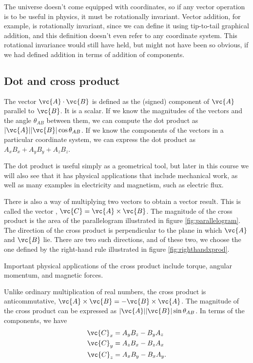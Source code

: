 The universe doesn't come equipped with coordinates, so if any vector operation is to be useful in
physics, it must be rotationally invariant. Vector addition, for example, is rotationally invariant, since we
can define it using tip-to-tail graphical addition, and this definition doesn't even refer to any coordinate
system. This rotational invariance would still have held, but might not have been so obvious,
if we had defined addition in terms of addition of components.

\subsection{Dot and cross product}

The vector  $\vc{A}\cdot\vc{B}$ is defined as the (signed) component of $\vc{A}$
parallel to $\vc{B}$. It is a scalar. If we know the magnitudes of the vectors and the angle $\theta_{AB}$ between them,
we can compute the dot product as $|\vc{A}||\vc{B}|\cos\theta_{AB}$. If we know the components of
the vectors in a particular coordinate system, we can express the dot product as
$A_xB_x+A_yB_y+A_zB_z$.

The dot product is useful simply as a geometrical tool, but later in this course we will also see that it
has physical applications that include mechanical work, as well as many examples in electricity and magnetism,
such as electric flux.

There is also a way of multiplying two vectors to obtain a vector result. This is called the
vector , $\vc{C}=\vc{A}\times\vc{B}$.
The magnitude of the cross product is the area of the parallelogram
illustrated in figure \ref{fig:parallelogram}.
The direction of the cross product is perpendicular to the plane in which $\vc{A}$ and $\vc{B}$ lie.
There are two such directions, and of these two, we choose the one defined by the right-hand rule
illustrated in figure \ref{fig:righthandxprod}.



Important physical applications of the cross product include torque, angular momentum, and magnetic forces.

Unlike ordinary multiplication of real numbers, the cross product is anticommutative,
$\vc{A}\times\vc{B}=-\vc{B}\times\vc{A}$. The magnitude of the cross product can be expressed as
$|\vc{A}||\vc{B}|\sin\theta_{AB}$. In terms of the components, we have
\begin{align*}
        \vc{C}_x        &=  A_yB_z - B_yA_z\\
        \vc{C}_y        &=  A_zB_x - B_zA_x\\
        \vc{C}_z        &=  A_xB_y - B_xA_y.
\end{align*}
